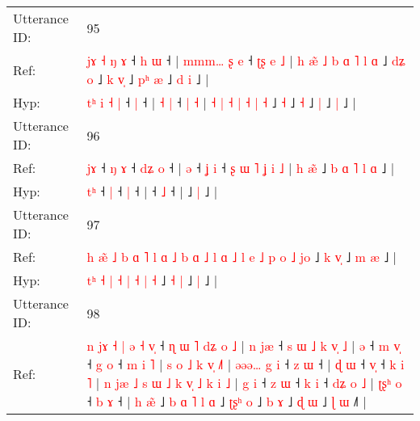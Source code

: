 \documentclass[10pt]{article}
\DeclareRobustCommand{\hl}[1]{{\textcolor{red}{#1}}}
\begin{document}
\begin{longtable}{ll}
\midrule
Utterance ID: & 95 \\
Ref: & \hl{j}\hl{ɤ} \hl{˧} \hl{ŋ} \hl{ɤ} ˧\hl{ }\hl{h} \hl{ɯ} ˧ |\hl{ }\hl{m}\hl{m}\hl{m}\hl{…} \hl{ʂ} \hl{e} ˧\hl{ }\hl{ʈ}\hl{ʂ} \hl{e} \hl{˩} |\hl{ }\hl{h} \hl{æ}\hl{̃} \hl{˩} \hl{b} \hl{ɑ} \hl{˥} \hl{l} \hl{ɑ} ˩\hl{ }\hl{d}\hl{ʑ} \hl{o} ˩\hl{ }\hl{k} \hl{v}\hl{̩} ˩\hl{ }\hl{p}\hl{ʰ} \hl{æ} ˩\hl{ }\hl{d} \hl{i} ˩ |
 \\
Hyp: & \hl{t}\hl{ʰ} \hl{i} \hl{˧} \hl{|} ˧\hl{}\hl{} \hl{|} ˧ |\hl{}\hl{}\hl{}\hl{}\hl{} \hl{˧} \hl{|} ˧\hl{}\hl{}\hl{} \hl{|} \hl{˧} |\hl{}\hl{} \hl{}\hl{˧} \hl{|} \hl{˧} \hl{|} \hl{˧} \hl{|} \hl{˧} ˩\hl{}\hl{}\hl{} \hl{˧} ˩\hl{}\hl{} \hl{}\hl{˧} ˩\hl{}\hl{}\hl{} \hl{|} ˩\hl{}\hl{} \hl{|} ˩ |
 \\
\midrule
Utterance ID: & 96 \\
Ref: & \hl{j}\hl{ɤ} ˧\hl{ }\hl{ŋ} \hl{ɤ} ˧\hl{ }\hl{d}\hl{ʑ} \hl{o} ˧ |\hl{ }\hl{ə} ˧\hl{ }\hl{ʝ} \hl{i} ˧\hl{ }\hl{ʂ}\hl{ }\hl{ɯ}\hl{ }\hl{˥}\hl{ }\hl{ʝ}\hl{ }\hl{i}\hl{ }\hl{˩} |\hl{ }\hl{h}\hl{ }\hl{æ}\hl{̃} ˩\hl{ }\hl{b}\hl{ }\hl{ɑ}\hl{ }\hl{˥}\hl{ }\hl{l} \hl{ɑ} ˩ |
 \\
Hyp: & \hl{t}\hl{ʰ} ˧\hl{}\hl{} \hl{|} ˧\hl{}\hl{}\hl{} \hl{|} ˧ |\hl{}\hl{} ˧\hl{}\hl{} \hl{˩} ˧\hl{}\hl{}\hl{}\hl{}\hl{}\hl{}\hl{}\hl{}\hl{}\hl{}\hl{}\hl{} |\hl{}\hl{}\hl{}\hl{}\hl{} ˩\hl{}\hl{}\hl{}\hl{}\hl{}\hl{}\hl{}\hl{} \hl{|} ˩ |
 \\
\midrule
Utterance ID: & 97 \\
Ref: & \hl{h}\hl{ }\hl{æ}\hl{̃}\hl{ }\hl{˩}\hl{ }\hl{b}\hl{ }\hl{ɑ}\hl{ }\hl{˥}\hl{ }\hl{l}\hl{ }\hl{ɑ}\hl{ }\hl{˩}\hl{ }\hl{b}\hl{ }\hl{ɑ}\hl{ }\hl{˩}\hl{ }\hl{l}\hl{ }\hl{ɑ}\hl{ }\hl{˩} \hl{l} \hl{e} \hl{˩} \hl{p} \hl{o} \hl{˩} \hl{j}\hl{o} ˩ \hl{k} \hl{v}\hl{̩} ˩\hl{ }\hl{m} \hl{æ} ˩ |
 \\
Hyp: & \hl{}\hl{}\hl{}\hl{}\hl{}\hl{}\hl{}\hl{}\hl{}\hl{}\hl{}\hl{}\hl{}\hl{}\hl{}\hl{}\hl{}\hl{}\hl{}\hl{}\hl{}\hl{}\hl{}\hl{}\hl{}\hl{}\hl{}\hl{}\hl{t}\hl{ʰ} \hl{˧} \hl{|} \hl{˧} \hl{|} \hl{˧} \hl{|} \hl{}\hl{˧} ˩ \hl{˧} \hl{}\hl{|} ˩\hl{}\hl{} \hl{|} ˩ |
 \\
\midrule
Utterance ID: & 98 \\
Ref: & \hl{n}\hl{ }\hl{j}\hl{ɤ}\hl{ }\hl{˧}\hl{ }\hl{|}\hl{ }\hl{ə}\hl{ }\hl{˧} \hl{v}\hl{̩} ˧\hl{ }\hl{ɳ}\hl{ }\hl{ɯ}\hl{ }\hl{˥}\hl{ }\hl{d}\hl{ʑ}\hl{ }\hl{o}\hl{ }\hl{˩} |\hl{ }\hl{n}\hl{ }\hl{j}\hl{æ} ˧\hl{ }\hl{s}\hl{ }\hl{ɯ}\hl{ }\hl{˩}\hl{ }\hl{k}\hl{ }\hl{v}\hl{̩}\hl{ }\hl{˩} |\hl{ }\hl{ə} ˧\hl{ }\hl{m} \hl{v}\hl{̩} ˧\hl{ }\hl{g} \hl{o} ˧\hl{ }\hl{m}\hl{ }\hl{i}\hl{ }\hl{˥} |\hl{ }\hl{s}\hl{ }\hl{o}\hl{ }\hl{˩}\hl{ }\hl{k}\hl{ }\hl{v}\hl{̩} \hl{˩}\hl{˥} |\hl{ }\hl{ə}\hl{ə}\hl{ə}\hl{…}\hl{ }\hl{g}\hl{ }\hl{i} ˧\hl{ }\hl{z} \hl{ɯ} ˧ |\hl{ }\hl{ɖ}\hl{ }\hl{ɯ} ˧ \hl{v}\hl{̩} ˧\hl{ }\hl{k}\hl{ }\hl{i}\hl{ }\hl{˥} |\hl{ }\hl{n}\hl{ }\hl{j}\hl{æ}\hl{ }\hl{˩}\hl{ }\hl{s}\hl{ }\hl{ɯ}\hl{ }\hl{˩}\hl{ }\hl{k}\hl{ }\hl{v}\hl{̩}\hl{ }\hl{˩}\hl{ }\hl{k}\hl{ }\hl{i} \hl{˩} |\hl{ }\hl{g}\hl{ }\hl{i} ˧\hl{ }\hl{z} \hl{ɯ} ˧\hl{ }\hl{k} \hl{i} ˧\hl{ }\hl{d}\hl{ʑ}\hl{ }\hl{o}\hl{ }\hl{˩} |\hl{ }\hl{ʈ}\hl{ʂ}\hl{ʰ}\hl{ }\hl{o} ˧\hl{ }\hl{b} \hl{ɤ} ˧ |\hl{ }\hl{h} \hl{æ}\hl{̃} ˩\hl{ }\hl{b}\hl{ }\hl{ɑ}\hl{ }\hl{˥}\hl{ }\hl{l} \hl{ɑ} ˩\hl{ }\hl{ʈ}\hl{ʂ}\hl{ʰ} \hl{o} ˩\hl{ }\hl{b} \hl{ɤ} ˩\hl{ }\hl{ɖ} \hl{ɯ} ˩\hl{ }\hl{ɭ} \hl{ɯ} ˩\hl{˥} |

\end{longtable}
\end{document}
